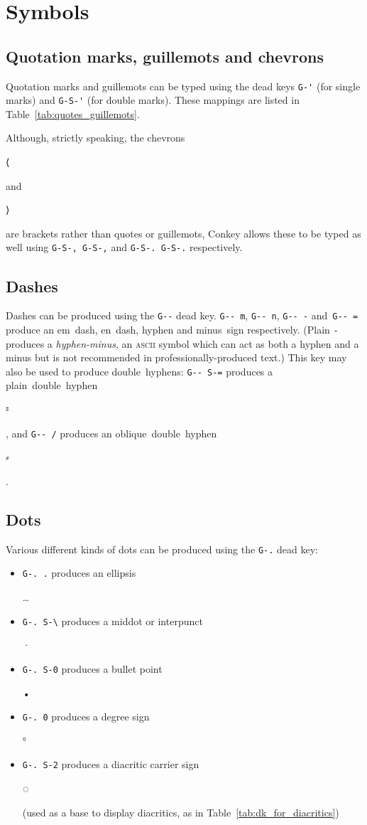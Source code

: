 \documentclass[oneside]{memoir}
\newcommand{\key}{\verb}
\newcommand{\out}[1]{\colorbox{gray!20}{\strut{}#1}}
\begin{document}
\section{Symbols}
\label{sec:symbols}

\subsection{Quotation marks, guillemots and chevrons}
\label{sec:quotation_marks_guillemots_chevrons}

Quotation marks and guillemots can be typed using the dead keys
  \key|G-'| (for single marks) and \key|G-S-'| (for double marks).
These mappings are listed in Table~\ref{tab:quotes_guillemots}.

Although, strictly speaking, the chevrons \out{⟨} and \out{⟩} are brackets rather than quotes or guillemots,
  Conkey allows these to be typed as well using \key|G-S-, G-S-,| and \key|G-S-. G-S-.| respectively.

\subsection{Dashes}
\label{sec:dashes}

Dashes can be produced using the \key|G--| dead key.
\key|G-- m|, \key|G-- n|, \key|G-- -| and~\key|G-- =|
  produce an em~dash, en~dash, hyphen and minus~sign respectively.
(Plain \key|-| produces a \textit{hyphen-minus},
  an \textsc{ascii} symbol which can act as both a hyphen and a minus
  but is not recommended in professionally-produced text.)
This key may also be used to produce double~hyphens:
\key|G-- S-=| produces a plain~double~hyphen \out{⹀}, and \key|G-- /| produces an oblique~double~hyphen \out{⸗}.

\subsection{Dots}
\label{sec:dots}

Various different kinds of dots can be produced using the \key|G-.| dead key:

\begin{itemize}[noitemsep]
\item \key|G-. .| produces an ellipsis \out{…}
\item \key|G-. S-\| produces a middot or interpunct \out{·}
\item \key|G-. S-0| produces a bullet point \out{•}
\item \key|G-. 0| produces a degree sign \out{°}
\item \key|G-. S-2| produces a diacritic carrier sign \out{◌}
  (used as a base to display diacritics, as in Table~\ref{tab:dk_for_diacritics})
\end{itemize}
\end{document}
